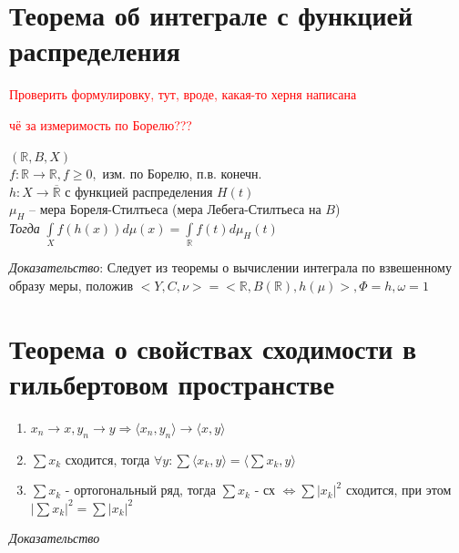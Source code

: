 \documentclass[paper=a4, fontsize=17pt]{article}
\begin{document}
\section{Теорема об интеграле с функцией распределения}
\textcolor{red}{Проверить формулировку, тут, вроде, какая-то херня написана}

\textcolor{red}{чё за измеримость по Борелю???}

$(\mathbb{R}, B, X)$ \\
$f:\mathbb{R}\rightarrow\mathbb{R}, f \ge 0,$ изм. по Борелю, п.в. конечн.\\
$h: X \rightarrow \overline{\mathbb{R}}$ с функцией распределения $H(t)$\\

$\mu_H$ -- мера Бореля-Стилтьеса (мера Лебега-Стилтьеса на $B$)\\

\emph{Тогда} $\int\limits_X f(h(x))d\mu(x) = \int\limits_{\mathbb{R}}f(t)d\mu_{H}(t)$

\emph{Доказательство}:
Следует из теоремы о вычислении интеграла по взвешенному образу меры, положив $<Y, C, \nu> = <\mathbb{R}, B(\mathbb{R}), h(\mu)>, \Phi = h, \omega = 1$

\section{Теорема о свойствах сходимости в гильбертовом пространстве}
\begin{enumerate}
	\item $x_n \rightarrow x, y_n \rightarrow y \Rightarrow \langle x_n, y_n \rangle \rightarrow \langle x, y \rangle$

	\item $\sum x_k$ сходится, тогда $\forall y: \sum \langle x_k, y \rangle = \langle \sum x_k, y \rangle$

	\item $\sum x_k$ - ортогональный ряд, тогда $\sum x_k$ - сх $\Leftrightarrow \sum |x_k|^2$ сходится, при этом $|\sum x_k|^2 = \sum |x_k|^2$

\end{enumerate}

\emph{Доказательство}
\end{document}
